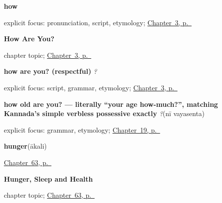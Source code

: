 \noindent\begin{minipage}[t]{\linewidth}
\raggedright
\textbf{how}\enspace\emph{}\par
\footnotesize explicit focus: pronunciation, script, etymology; \hyperref[ch:responding]{Chapter~3, p.~\pageref*{ch:responding}}
\end{minipage}\par\smallskip

\noindent\begin{minipage}[t]{\linewidth}
\raggedright
\textbf{How Are You?}\par
\footnotesize chapter topic; \hyperref[ch:responding]{Chapter~3, p.~\pageref*{ch:responding}}
\end{minipage}\par\smallskip

\noindent\begin{minipage}[t]{\linewidth}
\raggedright
\textbf{how are you? (respectful)}\enspace\emph{  ?}\par
\footnotesize explicit focus: script, grammar, etymology; \hyperref[ch:responding]{Chapter~3, p.~\pageref*{ch:responding}}
\end{minipage}\par\smallskip

\noindent\begin{minipage}[t]{\linewidth}
\raggedright
\textbf{how old are you? — literally \textquotedblleft{}your age how-much?\textquotedblright{}, matching Kannada's simple verbless possessive exactly}\enspace\emph{ ?}\enspace(nī vayasenta)\par
\footnotesize explicit focus: grammar, etymology; \hyperref[ch:te-asking-age]{Chapter~19, p.~\pageref*{ch:te-asking-age}}
\end{minipage}\par\smallskip

\noindent\begin{minipage}[t]{\linewidth}
\raggedright
\textbf{hunger}\enspace\emph{}\enspace(ākali)\par
\footnotesize \hyperref[ch:te-health]{Chapter~63, p.~\pageref*{ch:te-health}}
\end{minipage}\par\smallskip

\noindent\begin{minipage}[t]{\linewidth}
\raggedright
\textbf{Hunger, Sleep and Health}\par
\footnotesize chapter topic; \hyperref[ch:te-health]{Chapter~63, p.~\pageref*{ch:te-health}}
\end{minipage}\par\smallskip

